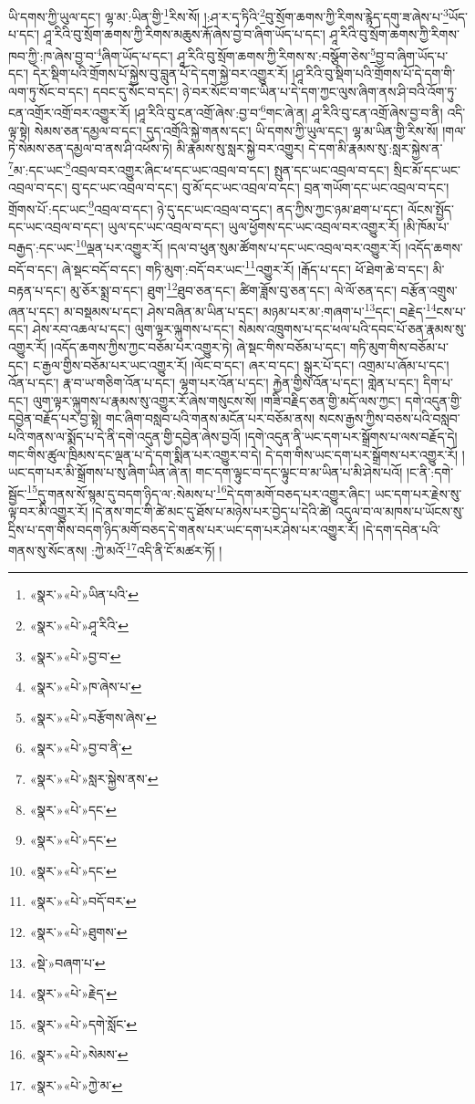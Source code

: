 ཡི་དགས་ཀྱི་ཡུལ་དང་། ལྷ་མ་:ཡིན་གྱི་\footnote{«སྣར་»«པེ་»ཡིན་པའི་}རིས་སོ། །:ཤ་ར་དྭ་ཏིའི་\footnote{«སྣར་»«པེ་»ཤཱ་རིའི་}བུ་སྲོག་ཆགས་ཀྱི་རིགས་རྙེད་དགུ་ཟ་ཞེས་པ་\footnote{«སྣར་»«པེ་»བྱ་བ་}ཡོད་པ་དང་། ཤཱ་རིའི་བུ་སྲོག་ཆགས་ཀྱི་རིགས་མཆུས་རྐོ་ཞེས་བྱ་བ་ཞིག་ཡོད་པ་དང་། ཤཱ་རིའི་བུ་སྲོག་ཆགས་ཀྱི་རིགས་ཁབ་ཀྱི་:ཁ་ཞེས་བྱ་བ་\footnote{«སྣར་»«པེ་»ཁ་ཞེས་པ་}ཞིག་ཡོད་པ་དང་། ཤཱ་རིའི་བུ་སྲོག་ཆགས་ཀྱི་རིགས་ས་:བསྩོག་ཅེས་\footnote{«སྣར་»«པེ་»བརྩོགས་ཞེས་}བྱ་བ་ཞིག་ཡོད་པ་དང་། དེར་སྡིག་པའི་གྲོགས་པོ་སྐྱེས་བུ་བླུན་པོ་དེ་དག་སྐྱེ་བར་འགྱུར་རོ། །ཤཱ་རིའི་བུ་སྡིག་པའི་གྲོགས་པོ་དེ་དག་གི་ལག་ཏུ་སོང་བ་དང་། དབང་དུ་སོང་བ་དང་། ཉེ་བར་སོང་བ་གང་ཡིན་པ་དེ་དག་ཀྱང་ལུས་ཞིག་ནས་ཤི་བའི་འོག་ཏུ་ངན་འགྲོར་འགྲོ་བར་འགྱུར་རོ། །ཤཱ་རིའི་བུ་ངན་འགྲོ་ཞེས་:བྱ་བ་\footnote{«སྣར་»«པེ་»བྱ་བ་ནི་}གང་ཞེ་ན། ཤཱ་རིའི་བུ་ངན་འགྲོ་ཞེས་བྱ་བ་ནི། འདི་ལྟ་སྟེ། སེམས་ཅན་དམྱལ་བ་དང་། དུད་འགྲོའི་སྐྱེ་གནས་དང་། ཡི་དགས་ཀྱི་ཡུལ་དང་། ལྷ་མ་ཡིན་གྱི་རིས་སོ། །གལ་ཏེ་སེམས་ཅན་དམྱལ་བ་ནས་ཤི་འཕོས་ཏེ། མི་རྣམས་སུ་སླར་སྐྱེ་བར་འགྱུར། དེ་དག་མི་རྣམས་སུ་:སླར་སྐྱེས་ན་\footnote{«སྣར་»«པེ་»སླར་སྐྱེས་ནས་}མ་:དང་ཡང་\footnote{«སྣར་»«པེ་»དང་}འབྲལ་བར་འགྱུར་ཞིང་ཕ་དང་ཡང་འབྲལ་བ་དང་། སྤུན་དང་ཡང་འབྲལ་བ་དང་། སྲིང་མོ་དང་ཡང་འབྲལ་བ་དང་། བུ་དང་ཡང་འབྲལ་བ་དང་། བུ་མོ་དང་ཡང་འབྲལ་བ་དང་། བྲན་གཡོག་དང་ཡང་འབྲལ་བ་དང་། གྲོགས་པོ་:དང་ཡང་\footnote{«སྣར་»«པེ་»དང་}འབྲལ་བ་དང་། ཉེ་དུ་དང་ཡང་འབྲལ་བ་དང་། ནད་ཀྱིས་ཀྱང་ཉམ་ཐག་པ་དང་། ལོངས་སྤྱོད་དང་ཡང་འབྲལ་བ་དང་། ཡུལ་དང་ཡང་འབྲལ་བ་དང་། ཡུལ་ཕྱོགས་དང་ཡང་འབྲལ་བར་འགྱུར་རོ། །མི་ཁོམ་པ་བརྒྱད་:དང་ཡང་\footnote{«སྣར་»«པེ་»དང་}ལྡན་པར་འགྱུར་རོ། །དལ་བ་ཕུན་སུམ་ཚོགས་པ་དང་ཡང་འབྲལ་བར་འགྱུར་རོ། །འདོད་ཆགས་བདོ་བ་དང་། ཞེ་སྡང་བདོ་བ་དང་། གཏི་མུག་:བདོ་བར་ཡང་\footnote{«སྣར་»«པེ་»བདོ་བར་}འགྱུར་རོ། །རྒོད་པ་དང་། ཕོ་ཐེག་ཆེ་བ་དང་། མི་བརྟན་པ་དང་། མུ་ཅོར་སྨྲ་བ་དང་། ཐུག་\footnote{«སྣར་»«པེ་»ཐུགས་}ཐུབ་ཅན་དང་། ཚིག་ཟློས་བུ་ཅན་དང་། ལེ་ལོ་ཅན་དང་། བརྩོན་འགྲུས་ཞན་པ་དང་། མ་བསྡམས་པ་དང་། ཤེས་བཞིན་མ་ཡིན་པ་དང་། མཉམ་པར་མ་:གཞག་པ་\footnote{«སྡེ་»བཞག་པ་}དང་། བརྗེད་\footnote{«སྣར་»«པེ་»རྗེད་}ངས་པ་དང་། ཤེས་རབ་འཆལ་པ་དང་། ལུག་ལྟར་ལྐུགས་པ་དང་། སེམས་འཁྲུགས་པ་དང་ཕལ་པའི་དབང་པོ་ཅན་རྣམས་སུ་འགྱུར་རོ། །འདོད་ཆགས་ཀྱིས་ཀྱང་བཅོམ་པར་འགྱུར་ཏེ། ཞེ་སྡང་གིས་བཅོམ་པ་དང་། གཏི་མུག་གིས་བཅོམ་པ་དང་། ང་རྒྱལ་གྱིས་བཅོམ་པར་ཡང་འགྱུར་རོ། །ལོང་བ་དང་། ཞར་བ་དང་། སྒུར་པོ་དང་། འགྲམ་པ་ཞོམ་པ་དང་། འོན་པ་དང་། རྣ་བ་ཡ་གཅིག་འོན་པ་དང་། ལྷག་པར་འོན་པ་དང་། རྐྱེན་གྱིས་འོན་པ་དང་། གླེན་པ་དང་། དིག་པ་དང་། ལུག་ལྟར་ལྐུགས་པ་རྣམས་སུ་འགྱུར་རོ་ཞེས་གསུངས་སོ། །གཟི་བརྗིད་ཅན་གྱི་མདོ་ལས་ཀྱང་། དགེ་འདུན་གྱི་དབྱེན་བརྗོད་པར་བྱ་སྟེ། གང་ཞིག་བསླབ་པའི་གནས་མངོན་པར་བཅོམ་ནས། སངས་རྒྱས་ཀྱིས་བཅས་པའི་བསླབ་པའི་གནས་ལ་སྨོད་པ་དེ་ནི་དགེ་འདུན་གྱི་དབྱེན་ཞེས་བྱའོ། །དགེ་འདུན་ནི་ཡང་དག་པར་སྒྲོགས་པ་ལས་བརྗོད་དེ། གང་གིས་ཚུལ་ཁྲིམས་དང་ལྡན་པ་དེ་དག་སྨིན་པར་འགྱུར་བ་དེ། དེ་དག་གིས་ཡང་དག་པར་སྒྲོགས་པར་འགྱུར་རོ། །ཡང་དག་པར་མི་སྒྲོགས་པ་སུ་ཞིག་ཡིན་ཞེ་ན། གང་དག་ལྟུང་བ་དང་ལྟུང་བ་མ་ཡིན་པ་མི་ཤེས་པའོ། །ང་ནི་:དགེ་སྦྱོང་\footnote{«སྣར་»«པེ་»དགེ་སློང་}དུ་གནས་སོ་སྙམ་དུ་བདག་ཉིད་ལ་:སེམས་པ་\footnote{«སྣར་»«པེ་»སེམས་}དེ་དག་མགོ་བཅད་པར་འགྱུར་ཞིང་། ཡང་དག་པར་རྗེས་སུ་ལྟ་བར་མི་འགྱུར་རོ། །དེ་ནས་གང་གི་ཚེ་མང་དུ་ཐོས་པ་མཉེས་པར་བྱེད་པ་དེའི་ཚེ། འདུལ་བ་ལ་མཁས་པ་ཡོངས་སུ་དྲིས་པ་དག་གིས་བདག་ཉིད་མགོ་བཅད་དེ་གནས་པར་ཡང་དག་པར་ཤེས་པར་འགྱུར་རོ། །དེ་དག་དབེན་པའི་གནས་སུ་སོང་ནས། :ཀྱེ་མའོ་\footnote{«སྣར་»«པེ་»ཀྱེ་མ་}འདི་ནི་ངོ་མཚར་ཏོ། །
